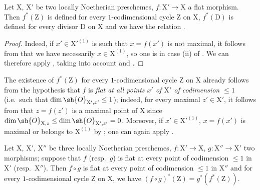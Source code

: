 \begin{proposition}[21.10.6]
\label{IV.21.10.6}
Let $\mathrm{X}$, $\mathrm{X}'$ be two locally Noetherian preschemes, $f:\mathrm{X}'\to\mathrm{X}$ a flat morphism.
Then $f^*(\mathrm{Z})$ is defined for every $1$-codimensional cycle $\mathrm{Z}$ on $\mathrm{X}$, $f^*(\mathrm{D})$ is defined for every divisor $\mathrm{D}$ on $\mathrm{X}$ and we have the relation .
\end{proposition}

\begin{proof}
Indeed, if $x'\in\mathrm{X}'^{(1)}$ is such that $x=f(x')$ is not maximal, it follows from  that we have necessarily $x\in\mathrm{X}^{(1)}$, so one is in case (ii) of .
We can therefore apply , taking into account  and .
\end{proof}

\begin{remark}[21.10.7]
\label{IV.21.10.7}
The existence of $f^*(\mathrm{Z})$ for every $1$-codimensional cycle $\mathrm{Z}$ on $\mathrm{X}$ already follows from the hypothesis that $f$ is \emph{flat at all points $x'$ of $\mathrm{X}'$ of codimension $\leq 1$} (i.e.\ such that $\dim\sh{O}_{\mathrm{X}',x'}\leq 1$); indeed, for every maximal $z'\in\mathrm{X}'$, it follows from  that $z=f(z')$ is a maximal point of $\mathrm{X}$ since $\dim\sh{O}_{\mathrm{X},z}\leq\dim\sh{O}_{\mathrm{X}',z'}=0$.
Moreover, if $x'\in\mathrm{X}'^{(1)}$, $x=f(x')$ is maximal or belongs to $\mathrm{X}^{(1)}$ by ; one can again apply .
\end{remark}

\begin{proposition}[21.10.8]
\label{IV.21.10.8}
Let $\mathrm{X}$, $\mathrm{X}'$, $\mathrm{X}''$ be three locally Noetherian preschemes, $f:\mathrm{X}'\to\mathrm{X}$, $g:\mathrm{X}''\to\mathrm{X}'$ two morphisms; suppose that $f$ (resp.\ $g$) is flat at every point of codimension $\leq 1$ in $\mathrm{X}'$ (resp.\ $\mathrm{X}''$).
Then $f\circ g$ is flat at every point of codimension $\leq 1$ in $\mathrm{X}''$ and for every $1$-codimensional cycle $\mathrm{Z}$ on $\mathrm{X}$, we have $(f\circ g)^*(\mathrm{Z})=g^*(f^*(\mathrm{Z}))$.
\end{proposition}

